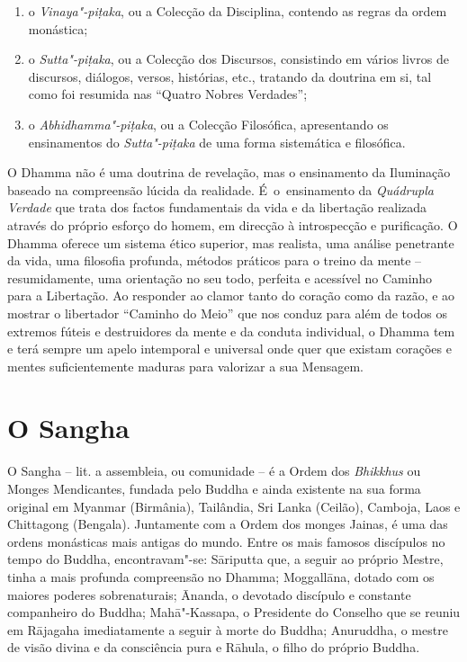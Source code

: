 \begin{enumerate}
  \item o \emph{Vinaya"-piṭaka}, ou a Colecção da Disciplina, contendo as regras
        da ordem monástica;

  \item o \emph{Sutta"-piṭaka}, ou a Colecção dos Discursos, consistindo em
        vários livros de discursos, diálogos, versos, histórias, etc., tratando
        da doutrina em si, tal como foi resumida nas “Quatro Nobres Verdades”;

  \item o \emph{Abhidhamma"-piṭaka}, ou a Colecção Filosófica, apresentando os
        ensinamentos do \emph{Sutta"-piṭaka} de uma forma sistemática e
        filosófica.
\end{enumerate}

O Dhamma não é uma doutrina de revelação, mas o ensinamento da Iluminação
baseado na compreensão lúcida da realidade. É~o~ensinamento da \emph{Quádrupla
  Verdade} que trata dos factos fundamentais da vida e da libertação realizada
através do próprio esforço do homem, em direcção à introspecção e purificação. O
Dhamma oferece um sistema ético superior, mas realista, uma análise
penetrante da vida, uma filosofia profunda, métodos práticos para o treino da
mente -- resumidamente, uma orientação no seu todo, perfeita e acessível no
Caminho para a Libertação. Ao responder ao clamor tanto do coração como da
razão, e ao mostrar o libertador “Caminho do Meio” que nos conduz para além de
todos os extremos fúteis e destruidores da mente e da conduta individual, o
Dhamma tem e terá sempre um apelo intemporal e universal onde quer que
existam corações e mentes suficientemente maduras para valorizar a sua Mensagem.

\section{O Sangha}

O Sangha -- lit. a assembleia, ou comunidade -- é a Ordem dos \emph{Bhikkhus} ou
Monges Mendicantes, fundada pelo Buddha e ainda existente na sua forma original
em Myanmar (Birmânia), Tailândia, Sri Lanka (Ceilão), Camboja, Laos e Chittagong
(Bengala). Juntamente com a Ordem dos monges Jainas, é uma das ordens monásticas
mais antigas do mundo. Entre os mais famosos discípulos no tempo do Buddha,
encontravam"-se: Sāriputta que, a seguir ao próprio Mestre, tinha a mais profunda
compreensão no Dhamma; Moggallāna, dotado com os maiores poderes
\mbox{sobrenaturais}; Ānanda, o devotado discípulo e constante companheiro do Buddha;
Mahā"-Kassapa, o Presidente do Conselho que se reuniu em Rājagaha imediatamente a
seguir à morte do Buddha; Anuruddha, o mestre de visão divina e da consciência
pura e Rāhula, o filho do próprio Buddha.

